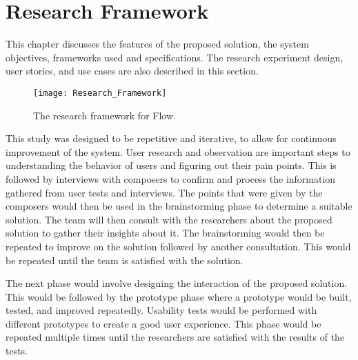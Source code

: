 %
%
%                 

\chapter{Research Framework}

This chapter discusses the features of the proposed solution, the system objectives, frameworks used and specifications. The research experiment design, user stories, and use cases are also described in this section. 

\begin{figure}[H]
	\centering
	\texttt{[image: Research\_Framework]}
    \caption{The research framework for Flow.}
    \label{fig:researchframework}
\end{figure}

This study was designed to be repetitive and iterative, to allow for continuous improvement of the system. User research and observation are important steps to understanding the behavior of users and figuring out their pain points. This is followed by interviews with composers to confirm and process the information gathered from user tests and interviews. The points that were given by the composers would then be used in the brainstorming phase to determine a suitable solution. The team will then consult with the researchers about the proposed solution to gather their insights about it. The brainstorming would then be repeated to improve on the solution followed by another consultation. This would be repeated until the team is satisfied with the solution.

The next phase would involve designing the interaction of the proposed solution. This would be followed by the prototype phase where a prototype would be built, tested, and improved repeatedly. Usability tests would be performed with different prototypes to create a good user experience. This phase would be repeated multiple times until the researchers are satisfied with the results of the tests.

